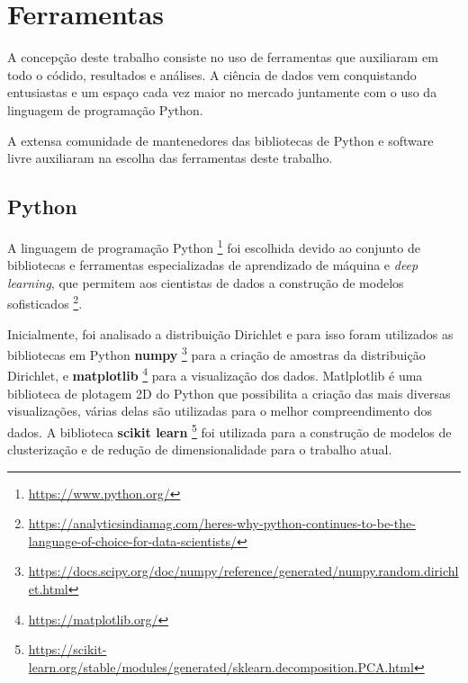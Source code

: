\section{Ferramentas}

A concepção deste trabalho consiste no uso de ferramentas que auxiliaram em todo o códido, resultados e análises. A ciência de dados vem conquistando entusiastas e um espaço cada vez maior no mercado juntamente com o uso da linguagem de programação Python. 

A extensa comunidade de mantenedores das bibliotecas de Python e software livre auxiliaram na escolha das ferramentas deste trabalho.


\subsection{Python}

A linguagem de programação Python \footnote{\href{https://www.python.org/}{https://www.python.org/}} foi escolhida devido ao conjunto de bibliotecas e ferramentas especializadas de aprendizado de máquina e \textit{deep learning}, que permitem aos cientistas de dados a construção de modelos sofisticados \footnote{\href{https://analyticsindiamag.com/heres-why-python-continues-to-be-the-language-of-choice-for-data-scientists/}{https://analyticsindiamag.com/heres-why-python-continues-to-be-the-language-of-choice-for-data-scientists/}}.

Inicialmente, foi analisado a distribuição Dirichlet e para isso foram utilizados as bibliotecas em Python \textbf{numpy} \footnote{\href{https://docs.scipy.org/doc/numpy/reference/generated/numpy.random.dirichlet.html}{https://docs.scipy.org/doc/numpy/reference/generated/numpy.random.dirichlet.html}} para a criação de amostras da distribuição Dirichlet, e \textbf{matplotlib} \footnote{\href{https://matplotlib.org/}{https://matplotlib.org/}} para a visualização dos dados. Matlplotlib é uma biblioteca de plotagem 2D do Python que possibilita a criação das mais diversas visualizações, várias delas são utilizadas para o melhor compreendimento dos dados. A biblioteca \textbf{scikit learn} \footnote{\href{https://scikit-learn.org/stable/modules/generated/sklearn.decomposition.PCA.html}{https://scikit-learn.org/stable/modules/generated/sklearn.decomposition.PCA.html}} foi utilizada para a construção de modelos de clusterização e de redução de dimensionalidade para o trabalho atual.

